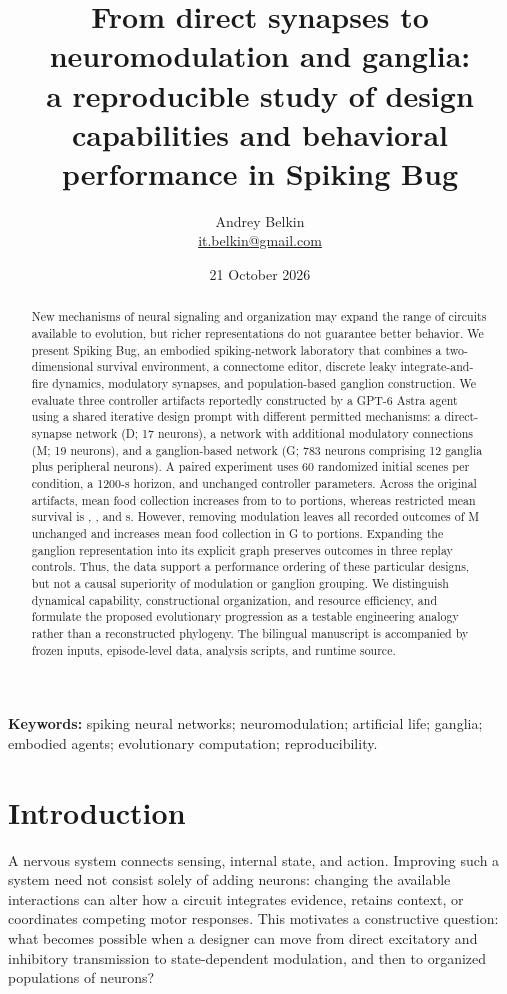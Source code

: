 \documentclass[11pt]{article}
\title{From direct synapses to neuromodulation and ganglia:\\a reproducible study of design capabilities and behavioral performance in Spiking Bug}
\author{Andrey Belkin\\\small\href{mailto:it.belkin@gmail.com}{it.belkin@gmail.com}}
\date{21 October 2026}
\begin{document}
\maketitle
\begin{abstract}
New mechanisms of neural signaling and organization may expand the range of circuits available to evolution, but richer representations do not guarantee better behavior. We present Spiking Bug, an embodied spiking-network laboratory that combines a two-dimensional survival environment, a connectome editor, discrete leaky integrate-and-fire dynamics, modulatory synapses, and population-based ganglion construction. We evaluate three controller artifacts reportedly constructed by a GPT-6 Astra agent using a shared iterative design prompt with different permitted mechanisms: a direct-synapse network (D; 17 neurons), a network with additional modulatory connections (M; 19 neurons), and a ganglion-based network (G; 783 neurons comprising 12 ganglia plus peripheral neurons). A paired experiment uses 60 randomized initial scenes per condition, a 1200-s horizon, and unchanged controller parameters. Across the original artifacts, mean food collection increases from \DFood{} to \MFood{} to \GFood{} portions, whereas restricted mean survival is \DTime{}, \MTime{}, and \GTime{} s. However, removing modulation leaves all recorded outcomes of M unchanged and increases mean food collection in G to \GNoModFood{} portions. Expanding the ganglion representation into its explicit graph preserves outcomes in three replay controls. Thus, the data support a performance ordering of these particular designs, but not a causal superiority of modulation or ganglion grouping. We distinguish dynamical capability, constructional organization, and resource efficiency, and formulate the proposed evolutionary progression as a testable engineering analogy rather than a reconstructed phylogeny. The bilingual manuscript is accompanied by frozen inputs, episode-level data, analysis scripts, and runtime source.
\end{abstract}
\noindent\textbf{Keywords:} spiking neural networks; neuromodulation; artificial life; ganglia; embodied agents; evolutionary computation; reproducibility.

\section{Introduction}
A nervous system connects sensing, internal state, and action. Improving such a system need not consist solely of adding neurons: changing the available interactions can alter how a circuit integrates evidence, retains context, or coordinates competing motor responses. This motivates a constructive question: what becomes possible when a designer can move from direct excitatory and inhibitory transmission to state-dependent modulation, and then to organized populations of neurons?
\end{document}
